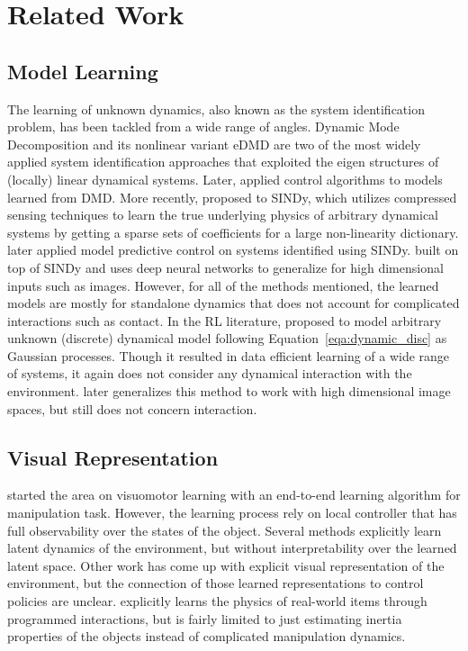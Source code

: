 \documentclass[conference]{IEEEtran}
\begin{document}
\section{Related Work}

\subsection{Model Learning}
The learning of unknown dynamics, also known as the system identification
problem, has been tackled from a wide range of angles. Dynamic Mode Decomposition
\cite{dmd} and its nonlinear variant eDMD \cite{edmd} are two of the most
widely applied system identification approaches that exploited the eigen
structures of (locally) linear dynamical systems. Later, \citet{dmdc} applied
control algorithms to models learned from DMD.
More recently, \citet{sindy} proposed to SINDy, which utilizes compressed
sensing techniques
to learn the true underlying physics of arbitrary dynamical systems by getting
a sparse sets of coefficients for a large non-linearity dictionary. \citet{sindyc}
later applied model predictive control on systems identified using SINDy.
\citet{deepsindy} built on top of SINDy and uses deep neural networks to
generalize for high dimensional inputs such as images. However,
for all of the methods mentioned, the learned models are mostly for
standalone dynamics that does not account for complicated interactions
such as contact.
In the RL literature, \citet{pilco} proposed to model arbitrary unknown
(discrete) dynamical model following Equation~\ref{eqa:dynamic_disc}
as Gaussian processes. Though it resulted in data efficient learning of a wide range
of systems, it again does not consider any dynamical interaction with the
environment. \citet{deeppilco} later generalizes this method to work with
high dimensional image spaces, but still does not concern interaction.

\subsection{Visual Representation}
\citet{deep_visuomotor} started the area on visuomotor learning with an end-to-end
learning algorithm for manipulation task. However, the learning process rely on local
controller that has full observability over the states of the object. Several
methods \cite{latent_dynamics, dream_to_control} explicitly learn latent dynamics
of the environment, but without interpretability over the learned latent space.
Other work \cite{vision_touch,dense_objnet} has come up with explicit visual
representation of the environment, but the connection of those learned representations
to control policies are unclear. \citet{dense_physics} explicitly learns the
physics of real-world items through programmed interactions, but is fairly
limited to just estimating inertia properties of the objects instead of
complicated manipulation dynamics.
\end{document}
